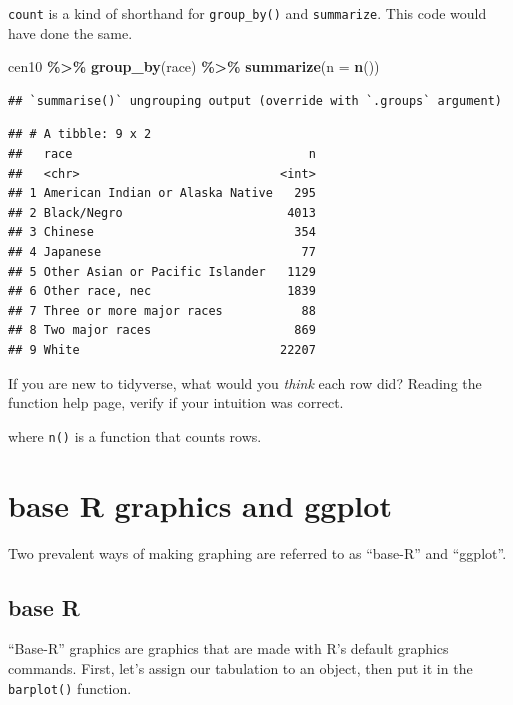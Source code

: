 \documentclass[
]{book}
\newenvironment{Shaded}{\begin{snugshade}}{\end{snugshade}}
\newcommand{\DataTypeTok}[1]{\textcolor[rgb]{0.13,0.29,0.53}{#1}}
\newcommand{\KeywordTok}[1]{\textcolor[rgb]{0.13,0.29,0.53}{\textbf{#1}}}
\newcommand{\NormalTok}[1]{#1}
\newcommand{\OperatorTok}[1]{\textcolor[rgb]{0.81,0.36,0.00}{\textbf{#1}}}
\newcommand{\StringTok}[1]{\textcolor[rgb]{0.31,0.60,0.02}{#1}}
\theoremstyle{definition}
\theoremstyle{definition}
\theoremstyle{definition}
\theoremstyle{remark}
\begin{document}
\texttt{count} is a kind of shorthand for \texttt{group\_by()} and \texttt{summarize}. This code would have done the same.

\begin{Shaded}
\begin{Highlighting}[]
\NormalTok{cen10 }\OperatorTok{\%>\%}\StringTok{ }
\StringTok{  }\KeywordTok{group\_by}\NormalTok{(race) }\OperatorTok{\%>\%}\StringTok{ }
\StringTok{  }\KeywordTok{summarize}\NormalTok{(}\DataTypeTok{n =} \KeywordTok{n}\NormalTok{())}
\end{Highlighting}
\end{Shaded}

\begin{verbatim}
## `summarise()` ungrouping output (override with `.groups` argument)
\end{verbatim}

\begin{verbatim}
## # A tibble: 9 x 2
##   race                                 n
##   <chr>                            <int>
## 1 American Indian or Alaska Native   295
## 2 Black/Negro                       4013
## 3 Chinese                            354
## 4 Japanese                            77
## 5 Other Asian or Pacific Islander   1129
## 6 Other race, nec                   1839
## 7 Three or more major races           88
## 8 Two major races                    869
## 9 White                            22207
\end{verbatim}

If you are new to tidyverse, what would you \emph{think} each row did? Reading the function help page, verify if your intuition was correct.

where \texttt{n()} is a function that counts rows.

\hypertarget{base-r-graphics-and-ggplot}{%
\section{base R graphics and ggplot}\label{base-r-graphics-and-ggplot}}

Two prevalent ways of making graphing are referred to as ``base-R'' and ``ggplot''.

\hypertarget{base-r}{%
\subsection{base R}\label{base-r}}

``Base-R'' graphics are graphics that are made with R's default graphics commands. First, let's assign our tabulation to an object,
then put it in the \texttt{barplot()} function.
\end{document}
